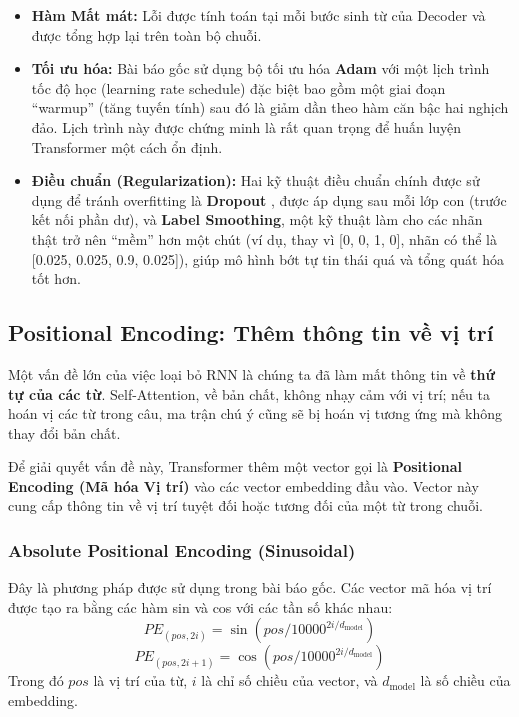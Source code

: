 \begin{itemize}
    \item \textbf{Hàm Mất mát:} Lỗi được tính toán tại mỗi bước sinh từ của Decoder và được tổng hợp lại trên toàn bộ chuỗi.
    \item \textbf{Tối ưu hóa:} Bài báo gốc sử dụng bộ tối ưu hóa \textbf{Adam} \cite{kingma2014adam} với một lịch trình tốc độ học (learning rate schedule) đặc biệt bao gồm một giai đoạn “warmup” (tăng tuyến tính) sau đó là giảm dần theo hàm căn bậc hai nghịch đảo. Lịch trình này được chứng minh là rất quan trọng để huấn luyện Transformer một cách ổn định.
    \item \textbf{Điều chuẩn (Regularization):} Hai kỹ thuật điều chuẩn chính được sử dụng để tránh overfitting là \textbf{Dropout} \cite{srivastava2014dropout}, được áp dụng sau mỗi lớp con (trước kết nối phần dư), và \textbf{Label Smoothing}, một kỹ thuật làm cho các nhãn thật trở nên “mềm” hơn một chút (ví dụ, thay vì [0, 0, 1, 0], nhãn có thể là [0.025, 0.025, 0.9, 0.025]), giúp mô hình bớt tự tin thái quá và tổng quát hóa tốt hơn.
\end{itemize}

\subsection{Positional Encoding: Thêm thông tin về vị trí}
\label{ssec:positional_encoding_intro}

Một vấn đề lớn của việc loại bỏ RNN là chúng ta đã làm mất thông tin về \textbf{thứ tự của các từ}. Self-Attention, về bản chất, không nhạy cảm với vị trí; nếu ta hoán vị các từ trong câu, ma trận chú ý cũng sẽ bị hoán vị tương ứng mà không thay đổi bản chất.

Để giải quyết vấn đề này, Transformer thêm một vector gọi là \textbf{Positional Encoding (Mã hóa Vị trí)} vào các vector embedding đầu vào. Vector này cung cấp thông tin về vị trí tuyệt đối hoặc tương đối của một từ trong chuỗi.

\subsubsection{Absolute Positional Encoding (Sinusoidal)}
Đây là phương pháp được sử dụng trong bài báo gốc. Các vector mã hóa vị trí được tạo ra bằng các hàm sin và cos với các tần số khác nhau:
$$ PE_{(pos, 2i)} = \sin(pos / 10000^{2i/d_{\text{model}}}) $$
$$ PE_{(pos, 2i+1)} = \cos(pos / 10000^{2i/d_{\text{model}}}) $$
Trong đó $pos$ là vị trí của từ, $i$ là chỉ số chiều của vector, và $d_{\text{model}}$ là số chiều của embedding.
